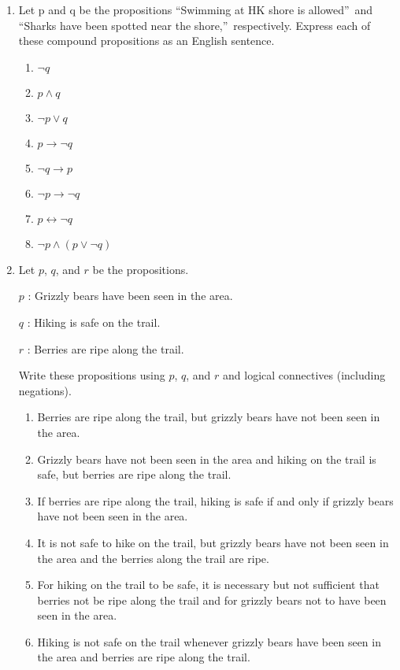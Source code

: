 \documentclass{../../cls/sig-alternate-05-2015}
\begin{document}
\begin{enumerate}
\item Let p and q be the propositions \textquotedblleft Swimming at HK shore is allowed\textquotedblright\ and \textquotedblleft Sharks have been spotted
near the shore,\textquotedblright\ respectively. Express each of these compound
propositions as an English sentence.
\begin{enumerate}
	\item $\neg q$
	\item $p \wedge q$
	\item $\neg p \vee q$
	\item $p \rightarrow \neg q$
	\item $\neg q \rightarrow p$
	\item $\neg p \rightarrow \neg q$
	\item $p \leftrightarrow \neg q$
	\item $\neg p \wedge (p \vee \neg q)$
\end{enumerate}

\item Let $p$, $q$, and $r$ be the propositions.

$p$ : Grizzly bears have been seen in the area.

$q$ : Hiking is safe on the trail.

$r$ : Berries are ripe along the trail.

Write these propositions using $p$, $q$, and $r$ and logical
connectives (including negations).
\begin{enumerate}
\item Berries are ripe along the trail, but grizzly bears have
not been seen in the area.
\item Grizzly bears have not been seen in the area and hiking
on the trail is safe, but berries are ripe along the
trail.
\item If berries are ripe along the trail, hiking is safe if and
only if grizzly bears have not been seen in the area.
\item It is not safe to hike on the trail, but grizzly bears have
not been seen in the area and the berries along the trail
are ripe.
\item For hiking on the trail to be safe, it is necessary but not
sufficient that berries not be ripe along the trail and
for grizzly bears not to have been seen in the area.
\item Hiking is not safe on the trail whenever grizzly bears
have been seen in the area and berries are ripe along
the trail.
\end{enumerate}


\end{enumerate}
\end{document}

